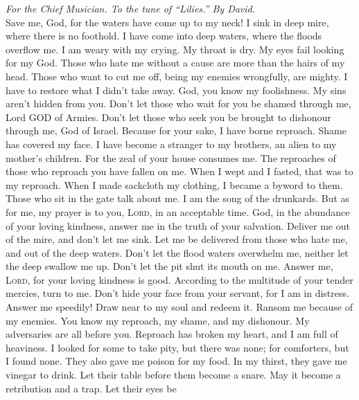 \emph{For the Chief Musician. To the tune of ``Lilies.'' By David.}\\
 Save me, God, for the waters have come up to my neck!
 I sink in deep mire, where there is no foothold. I have
come into deep waters, where the floods overflow me.  I am
weary with my crying. My throat is dry. My eyes fail looking for my God.
 Those who hate me without a cause are more than the hairs
of my head. Those who want to cut me off, being my enemies wrongfully,
are mighty. I have to restore what I didn't take away. 
God, you know my foolishness. My sins aren't hidden from you.
 Don't let those who wait for you be shamed through me,
Lord GOD of Armies. Don't let those who seek you be brought to dishonour
through me, God of Israel.  Because for your sake, I have
borne reproach. Shame has covered my face.  I have become
a stranger to my brothers, an alien to my mother's children.
 For the zeal of your house consumes me. The reproaches of
those who reproach you have fallen on me.  When I wept
and I fasted, that was to my reproach.  When I made
sackcloth my clothing, I became a byword to them.  Those
who sit in the gate talk about me. I am the song of the drunkards.
 But as for me, my prayer is to you, \textsc{Lord}, in an
acceptable time. God, in the abundance of your loving kindness, answer
me in the truth of your salvation.  Deliver me out of the
mire, and don't let me sink. Let me be delivered from those who hate me,
and out of the deep waters.  Don't let the flood waters
overwhelm me, neither let the deep swallow me up. Don't let the pit shut
its mouth on me.  Answer me, \textsc{Lord}, for your
loving kindness is good. According to the multitude of your tender
mercies, turn to me.  Don't hide your face from your
servant, for I am in distress. Answer me speedily!  Draw
near to my soul and redeem it. Ransom me because of my enemies.
 You know my reproach, my shame, and my dishonour. My
adversaries are all before you.  Reproach has broken my
heart, and I am full of heaviness. I looked for some to take pity, but
there was none; for comforters, but I found none.  They
also gave me poison for my food. In my thirst, they gave me vinegar to
drink.  Let their table before them become a snare. May
it become a retribution and a trap.  Let their eyes be
